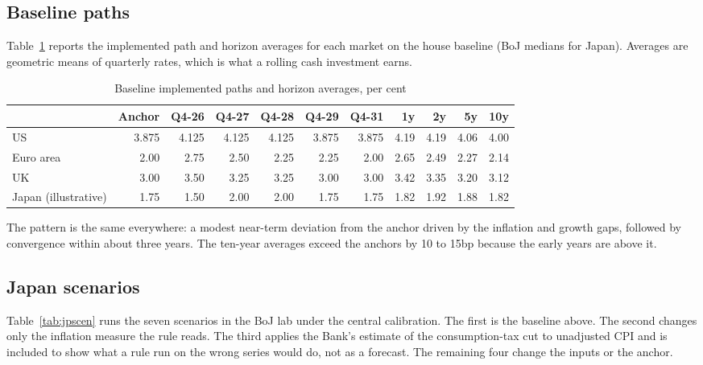 \documentclass[11pt,a4paper]{article}
\begin{document}
\subsection{Baseline paths}

Table~\ref{tab:paths} reports the implemented path and horizon averages for each market on the house baseline (BoJ medians for Japan). Averages are geometric means of quarterly rates, which is what a rolling cash investment earns.

\begin{table}[htbp]
\centering\small
\caption{Baseline implemented paths and horizon averages, per cent}
\label{tab:paths}
\begin{tabular}{@{}lrrrrrrrrrr@{}}
\toprule
 & Anchor & Q4-26 & Q4-27 & Q4-28 & Q4-29 & Q4-31 & 1y & 2y & 5y & 10y \\
\midrule
US & 3.875 & 4.125 & 4.125 & 4.125 & 3.875 & 3.875 & 4.19 & 4.19 & 4.06 & 4.00 \\
Euro area & 2.00 & 2.75 & 2.50 & 2.25 & 2.25 & 2.00 & 2.65 & 2.49 & 2.27 & 2.14 \\
UK & 3.00 & 3.50 & 3.25 & 3.25 & 3.00 & 3.00 & 3.42 & 3.35 & 3.20 & 3.12 \\
Japan (illustrative) & 1.75 & 1.50 & 2.00 & 2.00 & 1.75 & 1.75 & 1.82 & 1.92 & 1.88 & 1.82 \\
\bottomrule
\end{tabular}
\end{table}

The pattern is the same everywhere: a modest near-term deviation from the anchor driven by the inflation and growth gaps, followed by convergence within about three years. The ten-year averages exceed the anchors by 10 to 15bp because the early years are above it.

\subsection{Japan scenarios}

Table~\ref{tab:jpscen} runs the seven scenarios in the BoJ lab under the central calibration. The first is the baseline above. The second changes only the inflation measure the rule reads. The third applies the Bank's estimate of the consumption-tax cut to unadjusted CPI and is included to show what a rule run on the wrong series would do, not as a forecast. The remaining four change the inputs or the anchor.
\end{document}
